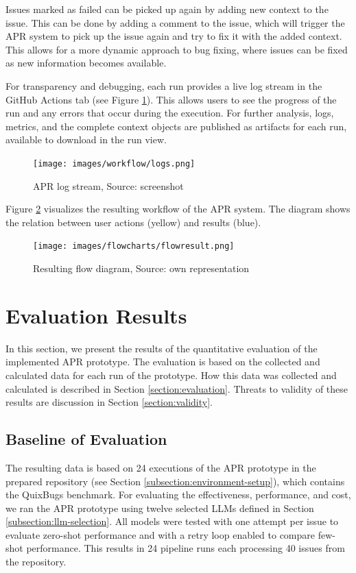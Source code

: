 Issues marked as failed can be picked up again by adding new context to the issue. This can be done by adding a comment to the issue, which will trigger the APR system to pick up the issue again and try to fix it with the added context. This allows for a more dynamic approach to bug fixing, where issues can be fixed as new information becomes available.

For transparency and debugging, each run provides a live log stream in the GitHub Actions tab (see Figure \ref{fig:log-stream}). This allows users to see the progress of the run and any errors that occur during the execution. For further analysis, logs, metrics, and the complete context objects are published as artifacts for each run, available to download in the run view.
\begin{figure}[H]
    \centering
    \texttt{[image: images/workflow/logs.png]}
    \caption{APR log stream, Source: screenshot}
    \label{fig:log-stream}
\end{figure}

Figure \ref{fig:flow} visualizes the resulting workflow of the APR system. The diagram shows the relation between user actions (yellow) and results (blue).

\begin{figure}[H]
    \centering
    \texttt{[image: images/flowcharts/flowresult.png]}
    \caption{Resulting flow diagram, Source: own representation}
    \label{fig:flow}
\end{figure}

\section{Evaluation Results} \label{section:evaluation-results}

In this section, we present the results of the quantitative evaluation of the implemented APR prototype. The evaluation is based on the collected and calculated data for each run of the prototype. How this data was collected and calculated is described in Section \ref{section:evaluation}. Threats to validity of these results are discussion in Section \ref{section:validity}.

\subsection{Baseline of Evaluation}

The resulting data is based on 24 executions of the APR prototype in the prepared repository (see Section \ref{subsection:environment-setup}), which contains the QuixBugs benchmark. For evaluating the effectiveness, performance, and cost, we ran the APR prototype using twelve selected \acp{LLM} defined in Section \ref{subsection:llm-selection}. All models were tested with one attempt per issue to evaluate zero-shot performance and with a retry loop enabled to compare few-shot performance. This results in 24 pipeline runs each processing 40 issues from the repository.

